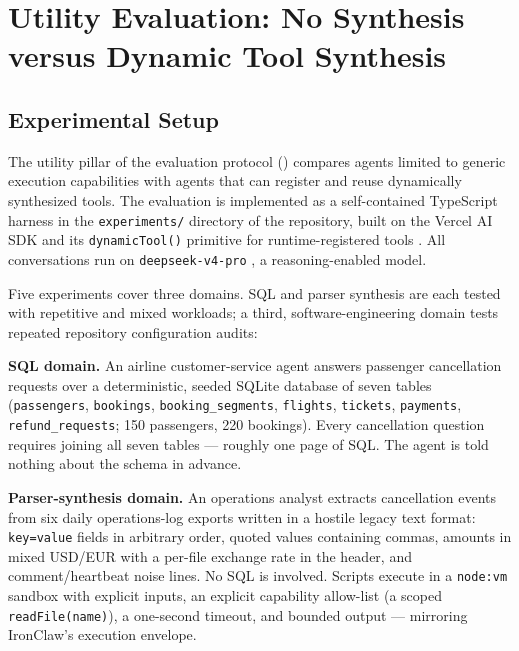 
\chapter{Utility Evaluation: No Synthesis versus Dynamic Tool Synthesis}
\label{ChapterEval}
\sloppy

\section{Experimental Setup}
The utility pillar of the evaluation protocol () compares
agents limited to generic execution capabilities with agents that can register and
reuse dynamically synthesized tools. The evaluation
is implemented as a self-contained TypeScript harness in the \texttt{experiments/}
directory of the repository, built on the Vercel AI SDK and its \texttt{dynamicTool()}
primitive for runtime-registered tools \cite{aisdk}. All conversations run on
\texttt{deepseek-v4-pro} \cite{deepseek}, a reasoning-enabled model.

Five experiments cover three domains. SQL and parser synthesis are each tested with
repetitive and mixed workloads; a third, software-engineering domain tests repeated
repository configuration audits:

\noindent\textbf{SQL domain.} An airline customer-service agent answers passenger
cancellation requests over a deterministic, seeded SQLite database of seven tables
(\texttt{passengers}, \texttt{bookings}, \texttt{booking\_segments}, \texttt{flights},
\texttt{tickets}, \texttt{payments}, \texttt{refund\_requests}; 150 passengers, 220
bookings). Every cancellation question requires joining all seven tables --- roughly
one page of SQL. The agent is told nothing about the schema in advance.

\noindent\textbf{Parser-synthesis domain.} An operations analyst extracts cancellation
events from six daily operations-log exports written in a hostile legacy text format:
\texttt{key=value} fields in arbitrary order, quoted values containing commas, amounts
in mixed USD/EUR with a per-file exchange rate in the header, and comment/heartbeat
noise lines. No SQL is involved. Scripts execute in a \texttt{node:vm} sandbox with
explicit inputs, an explicit capability allow-list (a scoped \texttt{readFile(name)}),
a one-second timeout, and bounded output --- mirroring IronClaw's execution envelope.

